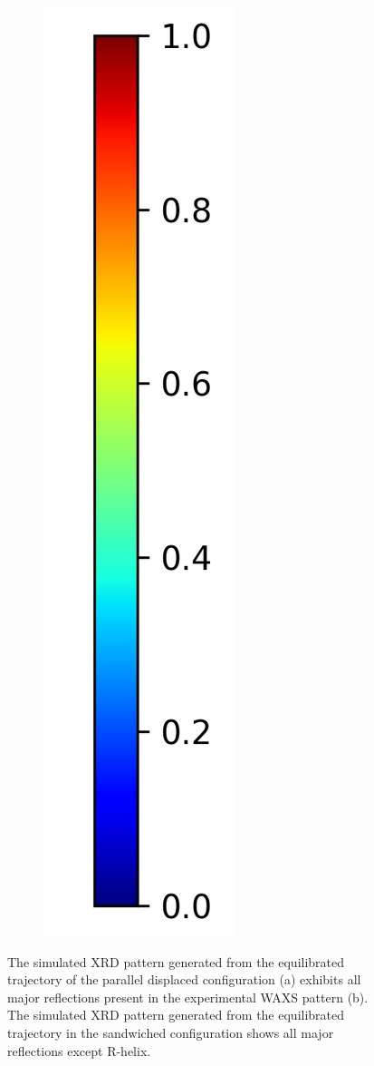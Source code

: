 \documentclass{article}
\begin{document}
\begin{figure}
\begin{subfigure}{0.0544\linewidth}
        \includegraphics[width=\linewidth]{colorbar_jet.png}
  \end{subfigure}
  \caption{The simulated XRD pattern generated from the equilibrated trajectory
	  of the parallel displaced configuration (a) exhibits all major reflections
	  present in the experimental WAXS pattern (b). The simulated XRD pattern
	  generated from the equilibrated trajectory in the sandwiched configuration shows
	  all major reflections except R-helix.}
  \label{fig:XRDsim}
  \end{figure}
\end{document}
